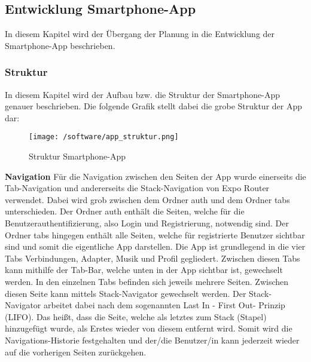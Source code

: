 \documentclass[11pt, twoside]{article}
\begin{document}
\subsection{Entwicklung Smartphone-App}
In diesem Kapitel wird der Übergang der Planung in die Entwicklung der Smartphone-App beschrieben.
\subsubsection{Struktur}
In diesem Kapitel wird der Aufbau bzw. die Struktur der Smartphone-App genauer beschrieben. Die folgende Grafik stellt dabei die grobe Struktur der App dar:
\begin{figure}
	\texttt{[image: /software/app\_struktur.png]}
\caption{Struktur Smartphone-App}
\end{figure}
\FloatBarrier
\noindent \textbf{Navigation} \newline
Für die Navigation zwischen den Seiten der App wurde einerseits die Tab-Navigation und andererseits die Stack-Navigation von \glqq Expo Router\grqq{} verwendet. Dabei wird grob zwischen dem Ordner \glqq auth\grqq{} und dem Ordner \glqq tabs\grqq{} unterschieden. Der Ordner \glqq auth\grqq{} enthält die Seiten, welche für die Benutzerauthentifizierung, also Login und Registrierung, notwendig sind. Der Ordner \glqq tabs\grqq{} hingegen enthält alle Seiten, welche für registrierte Benutzer sichtbar sind und somit die eigentliche App darstellen. Die App ist grundlegend in die vier Tabs \glqq Verbindungen\grqq{}, \glqq Adapter\grqq{}, \glqq Musik\grqq{} und \glqq Profil\grqq{}  gegliedert. Zwischen diesen Tabs kann mithilfe der Tab-Bar, welche unten in der App sichtbar ist, gewechselt werden. In den einzelnen Tabs befinden sich jeweils mehrere Seiten. Zwischen diesen Seite kann mittels Stack-Navigator gewechselt werden. Der Stack-Navigator arbeitet dabei nach dem sogenannten \glqq Last In - First Out\grqq{}- Prinzip (LIFO). Das heißt, dass die Seite, welche als letztes zum Stack (Stapel) hinzugefügt wurde, als Erstes wieder von diesem entfernt wird. Somit wird die Navigations-Historie festgehalten und der/die Benutzer/in kann jederzeit wieder auf die vorherigen Seiten zurückgehen. \parencite[vgl.][]{noauthor_urlpi28_nodate}
\end{document}
